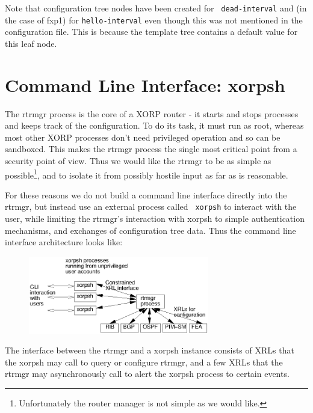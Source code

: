 \documentclass[11pt]{article}
\begin{document}
Note that configuration tree nodes have been created for {\tt
dead-interval} and (in the case of fxp1) for {\tt hello-interval} even
though this was not mentioned in the configuration file.  This is
because the template tree contains a default value for this leaf node.
\newpage
\section{Command Line Interface: xorpsh}
The rtrmgr process is the core of a XORP router - it starts and stops
processes and keeps track of the configuration.  To do its task, it
must run as root, whereas most other XORP processes don't need
privileged operation and so can be sandboxed.  This makes the rtrmgr
process the single most critical point from a security point of view.
Thus we would like the rtrmgr to be as simple as
possible\footnote{Unfortunately the router manager is not simple as we
would like.}, and to isolate it from possibly hostile input as far as
is reasonable.

For these reasons we do not build a command line interface directly
into the rtrmgr, but instead use an external process called {\tt
xorpsh} to interact with the user, while limiting the rtrmgr's
interaction with xorpsh to simple authentication mechanisms, and
exchanges of configuration tree data.  Thus the command line interface
architecture looks like:
\begin{figure}[htb]
\centerline{\includegraphics[width=0.7\textwidth]{figs/xorpsh}}
\vspace{.05in}
\end{figure}

The interface between the rtrmgr and a xorpsh instance consists of
XRLs that the xorpsh may call to query or configure rtrmgr, and a few
XRLs that the rtrmgr may asynchronously call to alert the xorpsh
process to certain events.  
\end{document}
